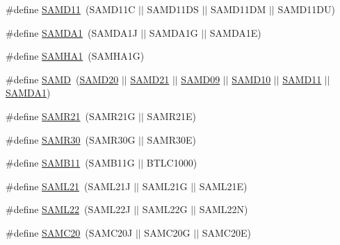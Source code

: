 \begin{DoxyCompactItemize}
\item 
\#define \hyperlink{group__sam__part__macros__group_ga9e5edb5637174377186d92141e7f60d9}{S\+A\+M\+D11}~(S\+A\+M\+D11\+C $\vert$$\vert$ S\+A\+M\+D11\+D\+S $\vert$$\vert$ S\+A\+M\+D11\+D\+M $\vert$$\vert$ S\+A\+M\+D11\+D\+U)
\item 
\#define \hyperlink{group__sam__part__macros__group_ga072dd622eab25246a14ce4a97a3df2df}{S\+A\+M\+D\+A1}~(S\+A\+M\+D\+A1\+J $\vert$$\vert$ S\+A\+M\+D\+A1\+G $\vert$$\vert$ S\+A\+M\+D\+A1\+E)
\item 
\#define \hyperlink{group__sam__part__macros__group_ga801950238d1ae14ecc1f1b41ebc6e392}{S\+A\+M\+H\+A1}~(S\+A\+M\+H\+A1\+G)
\item 
\#define \hyperlink{group__sam__part__macros__group_ga5eed5c828e076621e5274450cdc6c32b}{S\+A\+M\+D}~(\hyperlink{group__sam__part__macros__group_gad9193543e761f5967353a0464dde1e61}{S\+A\+M\+D20} $\vert$$\vert$ \hyperlink{group__sam__part__macros__group_gab9217b15071242235d3014381d61dbf7}{S\+A\+M\+D21} $\vert$$\vert$ \hyperlink{group__sam__part__macros__group_gafca3f645579e1a67ce865408ecb5269f}{S\+A\+M\+D09} $\vert$$\vert$ \hyperlink{group__sam__part__macros__group_gac83f6794433f2c57bfc5c520fe3d67ce}{S\+A\+M\+D10} $\vert$$\vert$ \hyperlink{group__sam__part__macros__group_ga9e5edb5637174377186d92141e7f60d9}{S\+A\+M\+D11} $\vert$$\vert$ \hyperlink{group__sam__part__macros__group_ga072dd622eab25246a14ce4a97a3df2df}{S\+A\+M\+D\+A1})
\item 
\#define \hyperlink{group__sam__part__macros__group_ga63b66a40b044f5f10d6dfa3ff51a0acb}{S\+A\+M\+R21}~(S\+A\+M\+R21\+G $\vert$$\vert$ S\+A\+M\+R21\+E)
\item 
\#define \hyperlink{group__sam__part__macros__group_gae396c6bd5babec94cd8a290c1ae60a9f}{S\+A\+M\+R30}~(S\+A\+M\+R30\+G $\vert$$\vert$ S\+A\+M\+R30\+E)
\item 
\#define \hyperlink{group__sam__part__macros__group_ga2af5455979bc458995adea5aaa7807a2}{S\+A\+M\+B11}~(S\+A\+M\+B11\+G $\vert$$\vert$ B\+T\+L\+C1000)
\item 
\#define \hyperlink{group__sam__part__macros__group_ga38e970d13ac9ee9d74c527ab43bc5c36}{S\+A\+M\+L21}~(S\+A\+M\+L21\+J $\vert$$\vert$ S\+A\+M\+L21\+G $\vert$$\vert$ S\+A\+M\+L21\+E)
\item 
\#define \hyperlink{group__sam__part__macros__group_ga5f904618e9b88b4d9981d6a374b09aa5}{S\+A\+M\+L22}~(S\+A\+M\+L22\+J $\vert$$\vert$ S\+A\+M\+L22\+G $\vert$$\vert$ S\+A\+M\+L22\+N)
\item 
\#define \hyperlink{group__sam__part__macros__group_gaac043547d8783c0cba34b7d3139c53a0}{S\+A\+M\+C20}~(S\+A\+M\+C20\+J $\vert$$\vert$ S\+A\+M\+C20\+G $\vert$$\vert$ S\+A\+M\+C20\+E)
$$
\end{DoxyCompactItemize}

